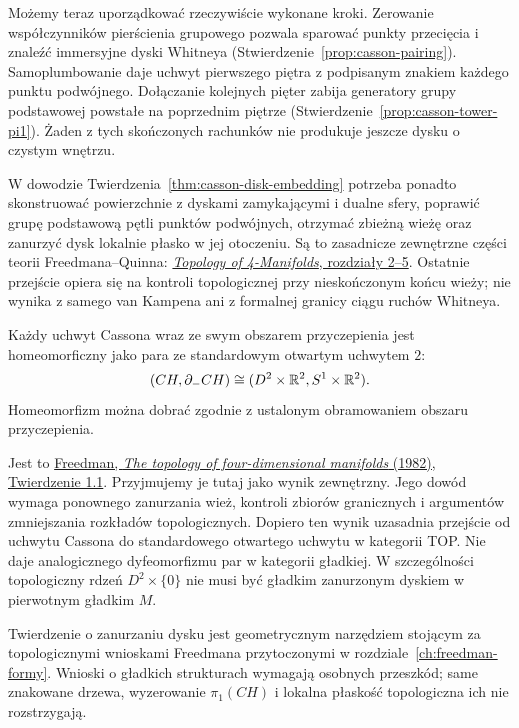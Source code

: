 Możemy teraz uporządkować rzeczywiście wykonane
kroki. Zerowanie współczynników pierścienia
grupowego pozwala sparować punkty przecięcia
i znaleźć immersyjne dyski Whitneya
(Stwierdzenie~\ref{prop:casson-pairing}).
Samoplumbowanie daje uchwyt pierwszego
piętra z podpisanym znakiem każdego punktu
podwójnego. Dołączanie kolejnych pięter zabija
generatory grupy podstawowej powstałe na
poprzednim piętrze
(Stwierdzenie~\ref{prop:casson-tower-pi1}).
Żaden z tych skończonych rachunków nie produkuje
jeszcze dysku o czystym wnętrzu.

W dowodzie Twierdzenia~\ref{thm:casson-disk-embedding}
potrzeba ponadto skonstruować powierzchnie z
dyskami zamykającymi i dualne sfery, poprawić
grupę podstawową pętli punktów podwójnych,
otrzymać zbieżną wieżę oraz zanurzyć dysk
lokalnie płasko w jej otoczeniu. Są to zasadnicze
zewnętrzne części teorii Freedmana--Quinna:
\href{https://archive.mpim-bonn.mpg.de/4789/2/FreedmanQuinn-TopologyOf4Manifolds-Reformatted2013.pdf}
{\emph{Topology of 4-Manifolds}, rozdziały 2--5}.
Ostatnie przejście opiera się na kontroli
topologicznej przy nieskończonym końcu wieży;
nie wynika z samego van Kampena ani z formalnej
granicy ciągu ruchów Whitneya.

\begin{twierdzenie}
\label{thm:casson-homeomorphism}
Każdy uchwyt Cassona wraz ze swym obszarem
przyczepienia jest homeomorficzny jako para ze
standardowym otwartym uchwytem $2$:
\[
 (CH,\partial_-CH)\cong
 (D^2\times\mathbb{R}^2,S^1\times\mathbb{R}^2).
\]
Homeomorfizm można dobrać zgodnie z ustalonym
obramowaniem obszaru przyczepienia.
\end{twierdzenie}

Jest to \href{https://www.maths.gla.ac.uk/~mpowell/1982_The%20topology%20of%20four-dimensional%20manifolds.pdf}
{Freedman, \emph{The topology of four-dimensional
manifolds} (1982), Twierdzenie 1.1}.
Przyjmujemy je tutaj jako wynik zewnętrzny.
Jego dowód wymaga ponownego zanurzania wież,
kontroli zbiorów granicznych i argumentów
zmniejszania rozkładów topologicznych. Dopiero
ten wynik uzasadnia przejście od uchwytu Cassona
do standardowego otwartego uchwytu w kategorii
TOP. Nie daje analogicznego dyfeomorfizmu par
w kategorii gładkiej. W szczególności topologiczny
rdzeń $D^2\times\{0\}$ nie musi być gładkim
zanurzonym dyskiem w pierwotnym gładkim $M$.

Twierdzenie o zanurzaniu dysku jest geometrycznym
narzędziem stojącym za topologicznymi wnioskami
Freedmana przytoczonymi w
rozdziale~\ref{ch:freedman-formy}. Wnioski o
gładkich strukturach wymagają osobnych przeszkód;
same znakowane drzewa, wyzerowanie $\pi_1(CH)$
i lokalna płaskość topologiczna ich nie rozstrzygają.


